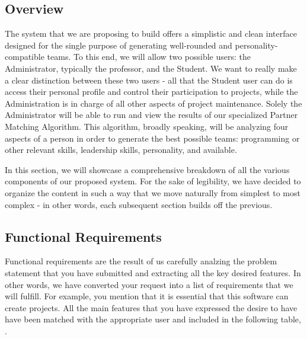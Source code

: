 \documentclass[12pt,letterpaper]{article}
\begin{document}
\subsection{Overview}

The system that we are proposing to build offers a simplistic and clean interface designed for the single purpose of generating 
well-rounded and personality-compatible teams. To this end, we will allow two possible users: the Administrator, typically the professor,
and the Student. We want to really make a clear distinction between these two users - all that the Student user can do is access their
personal profile and control their participation to projects, while the Administration is in charge of all other aspects of project maintenance. 
Solely the Administrator will be able to run and view the results of our specialized Partner Matching Algorithm. This algorithm, broadly speaking,
will be analyzing four aspects of a person in order to generate the best possible teams:  programming or other relevant skills, leadership skills,
personality, and available. 

In this section, we will showcase a comprehensive breakdown of all the various components of our proposed system. For the sake of 
legibility, we have decided to organize the content in such a way that we move naturally from simplest to most complex - in other words,
each subsequent section builds off the previous. 

\subsection{Functional Requirements}

Functional requirements are the result of us carefully analzing the problem statement that you have submitted and extracting all the key 
desired features. In other words, we have converted your request into a list of requirements that we will fulfill. For example, you mention that
it is essential that this software can create projects. All the main features that you have expressed the desire to have have been matched with
the appropriate user and included in the following table, . 
\end{document}
